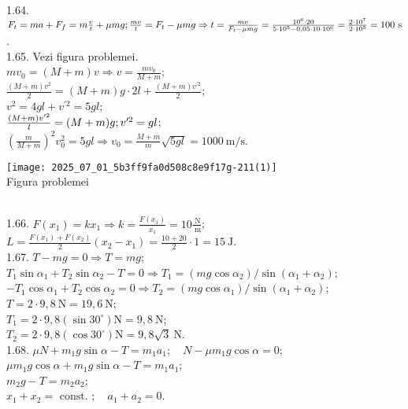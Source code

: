 1.64. $F_{t}=m a+F_{f}=m \frac{v}{t}+\mu m g;\\ \frac{m v}{t}=F_{t}-\mu m g \Rightarrow t=\frac{m v}{F_{t}-\mu m g}=\frac{10^{6} \cdot 20}{5 \cdot 10^{5}-0,05 \cdot 10 \cdot 10^{6}}=\frac{2 \cdot 10^{7}}{2 \cdot 10^{5}}=100 \mathrm{~s}$.\\

1.65. Vezi figura problemei.\\ $m v_{0}=(M+m) v \Rightarrow v=\frac{m v_{0}}{M+m}$;\\ $\frac{(M+m) v^{2}}{2}=(M+m) g \cdot 2 l+\frac{(M+m) v^{\prime 2}}{2}$;\\ $v^{2}=4 g l+v^{\prime 2}=5 g l$;\\ $\frac{(M+m) v^{\prime 2}}{l}=(M+m) g;\\ v^{\prime 2}=g l$;\\ $\left(\frac{m}{M+m}\right)^{2} v_{0}^{2}=5 g l \Rightarrow v_{0}=\frac{M+m}{m} \sqrt{5 g l}=1000 \mathrm{~m} / \mathrm{s}$.\\ \begin{center} \texttt{[image: 2025\_07\_01\_5b3ff9fa0d508c8e9f17g-211(1)]}\\ Figura problemei \end{center}\\

1.66. $F\left(x_{1}\right)=k x_{1} \Rightarrow k=\frac{F\left(x_{1}\right)}{x_{1}}=10 \frac{\mathrm{~N}}{\mathrm{~m}}$;\\ $L=\frac{F\left(x_{1}\right)+F\left(x_{2}\right)}{2}\left(x_{2}-x_{1}\right)=\frac{10+20}{2} \cdot 1=15 \mathrm{~J}$.\\

1.67. $T-m g=0 \Rightarrow T=m g$;\\ $T_{1} \sin \alpha_{1}+T_{2} \sin \alpha_{2}-T=0 \Rightarrow T_{1}=\left(m g \cos \alpha_{2}\right) / \sin \left(\alpha_{1}+\alpha_{2}\right)$;\\ $-T_{1} \cos \alpha_{1}+T_{2} \cos \alpha_{2}=0 \Rightarrow T_{2}=\left(m g \cos \alpha_{1}\right) / \sin \left(\alpha_{1}+\alpha_{2}\right)$;\\ $T=2 \cdot 9,8 \mathrm{~N}=19,6 \mathrm{~N}$;\\ $T_{1}=2 \cdot 9,8\left(\sin 30^{\circ}\right) \mathrm{N}=9,8 \mathrm{~N}$;\\ $T_{2}=2 \cdot 9,8\left(\cos 30^{\circ}\right) \mathrm{N}=9,8 \sqrt{3} \mathrm{~N}$.\\

1.68. $\mu N+m_{1} g \sin \alpha-T=m_{1} a_{1}; \quad N-\mu m_{1} g \cos \alpha=0$;\\ $\mu m_{1} g \cos \alpha+m_{1} g \sin \alpha-T=m_{1} a_{1}$;\\ $m_{2} g-T=m_{2} a_{2}$;\\ $x_{1}+x_{2}=\text { const. }; \quad a_{1}+a_{2}=0$.\\

